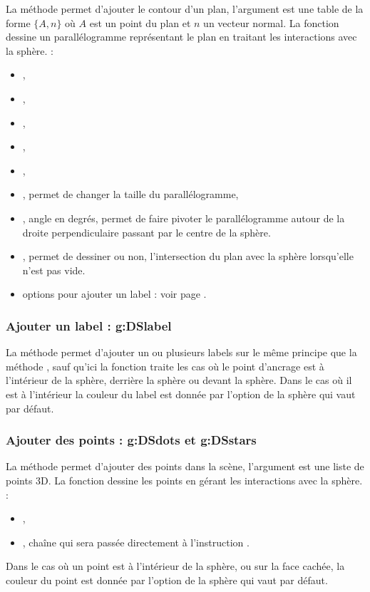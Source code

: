 La méthode  permet d'ajouter le contour d'un plan, l'argument  est une table de la forme $\{A,n\}$ où $A$ est un point du plan et $n$ un vecteur normal. La fonction dessine un parallélogramme représentant le plan  en traitant les interactions avec la sphère. \writeoptions :
    \begin{itemize}
        \item {}, 
        \item {},
        \item {},
        \item {},
        \item {},
        \item {}, permet de changer la taille du parallélogramme,
        \item {}, angle en degrés, permet de faire pivoter le parallélogramme autour de la droite perpendiculaire passant par le centre de la sphère.
        \item {}, permet de dessiner ou non, l'intersection du plan avec la sphère lorsqu'elle n'est pas vide.
        \item options pour ajouter un label : voir page \pageref{addlabel}.
    \end{itemize}    

\subsubsection{Ajouter un label : g:DSlabel}

La méthode  permet d'ajouter un ou plusieurs labels sur le même principe que la méthode , sauf qu'ici la fonction traite les cas où le point d'ancrage est à l'intérieur de la sphère, derrière la sphère ou devant la sphère. Dans le cas où il est à l'intérieur la couleur du label est donnée par l'option de la sphère  qui vaut  par défaut.

\subsubsection{Ajouter des points : g:DSdots et g:DSstars}

La méthode  permet d'ajouter des points dans la scène, l'argument  est une liste de points 3D. La fonction dessine les points en gérant les interactions avec la sphère. \writeoptions :
    \begin{itemize}
        \item {},
        \item {}, chaîne qui sera passée directement à l'instruction \drawcmd.
    \end{itemize}
Dans le cas où un point est à l'intérieur de la sphère, ou sur la face cachée, la couleur du point est donnée par l'option de la sphère  qui vaut  par défaut.

